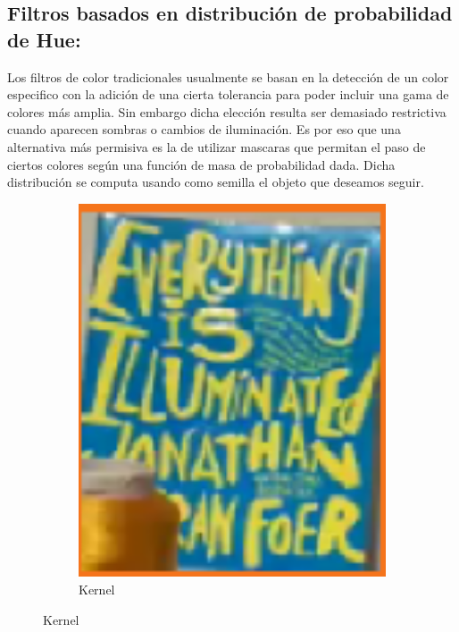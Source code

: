 \subsection{Filtros basados en distribución de probabilidad de Hue:}
Los filtros de color tradicionales usualmente se basan en la detección de un color especifico con la adición de una cierta tolerancia para poder incluir una gama de colores más amplia. Sin embargo dicha elección resulta ser demasiado restrictiva cuando aparecen sombras o cambios de iluminación. Es por eso que una alternativa más permisiva es la de utilizar mascaras que permitan el paso de ciertos colores según una función de masa de probabilidad dada. Dicha distribución se computa usando como semilla el objeto que deseamos seguir.
\begin{figure}[H]
\centering
	\begin{subfigure}{.1\textwidth}
		\centering
		\includegraphics[width=1.2\textwidth]{Imagenes/camshift_kernel.png}
		\caption{Kernel}
		\label{fig:kernelHistFilter}
	\end{subfigure}
\end{figure}

